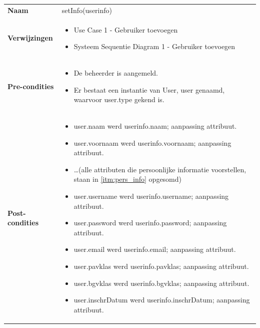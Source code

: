 \documentclass[a4paper]{article}
\begin{document}
\begin{tabularx}{\textwidth}{|l X|}
    \hline
    \textbf{Naam} & setInfo(userinfo) \\
    \textbf{Verwijzingen} & \begin{itemize}[leftmargin=*]
        \item Use Case 1 - Gebruiker toevoegen
        \item Systeem Sequentie Diagram 1 - Gebruiker toevoegen
    \end{itemize}\\
    \textbf{Pre-condities} & \begin{itemize}[leftmargin=*]
        \item De beheerder is aangemeld.
        \item Er bestaat een instantie van User, user genaamd, waarvoor user.type gekend is.
    \end{itemize}\\
    \textbf{Post-condities} & \begin{itemize}[leftmargin=*]
        \item user.naam werd userinfo.naam; aanpassing attribuut.
        \item user.voornaam werd userinfo.voornaam; aanpassing attribuut.
        \item \dots  (alle attributen die persoonlijke informatie voorstellen, staan in \ref{itm:pers_info} opgesomd)
        \item user.username werd userinfo.username; aanpassing attribuut.
        \item user.password werd userinfo.password; aanpassing attribuut.
        \item user.email werd userinfo.email; aanpassing attribuut.
        \item user.pavklas werd userinfo.pavklas; aanpassing attribuut.
        \item user.bgvklas werd userinfo.bgvklas; aanpassing attribuut.
        \item user.inschrDatum werd userinfo.inschrDatum; aanpassing attribuut.
    \end{itemize}\\
    \hline
\end{tabularx}\\
\end{document}
